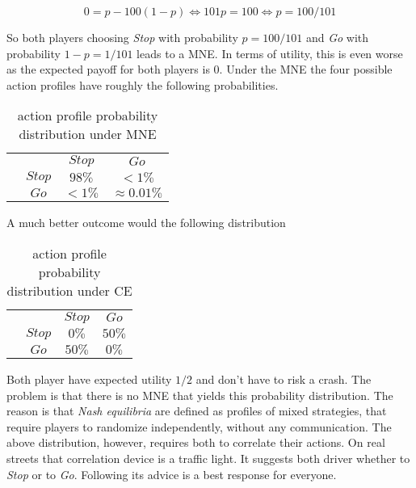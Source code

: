 \begin{equation*}
    0 = p - 100(1-p) \iff 101p = 100 \iff p = 100/101
\end{equation*}

So both players choosing \textit{Stop} with probability $p = 100/101$ and \textit{Go} with probability $1-p = 1/101$  leads to a MNE. In terms of utility, this is even worse as the expected payoff for both players is $0$. Under the MNE the four possible action
profiles have roughly the following probabilities. 

\begin{table}[H]\centering
\setlength{\extrarowheight}{2pt}
\begin{tabular}{cc|c|c|}
  & \multicolumn{1}{c}{} & \multicolumn{1}{c}{$Stop$}  & \multicolumn{1}{c}{$Go$} \\\cline{3-4}
  & $Stop$ & $98\%$ & $<1\%$ \\\cline{3-4}
  & $Go$ & $<1\%$ & $\approx 0.01\%$ \\\cline{3-4}
\end{tabular}\caption{\label{tab:probabilityUnderMNE}action profile probability distribution under MNE}
\end{table}

A much better outcome would the following distribution

\begin{table}[H]\centering
\setlength{\extrarowheight}{2pt}
\begin{tabular}{cc|c|c|}
  & \multicolumn{1}{c}{} & \multicolumn{1}{c}{$Stop$}  & \multicolumn{1}{c}{$Go$} \\\cline{3-4}
  & $Stop$ & $0\%$ & $50\%$ \\\cline{3-4}
  & $Go$ & $50\%$ & $0\%$ \\\cline{3-4}
\end{tabular}\caption{\label{tab:probabilityUnderCE}action profile probability distribution under CE}
\end{table}

Both player have expected utility $1/2$ and don't have to risk a crash. The problem is that there is no MNE that yields this probability distribution. The reason is that \textit{Nash equilibria} are defined as profiles of mixed strategies, that require players to randomize independently, without any
communication. The above distribution, however, requires both to correlate their actions. On real streets that correlation device is a traffic light. It suggests both driver whether to \textit{Stop} or to \textit{Go}. Following its advice is a best response for everyone. \\

